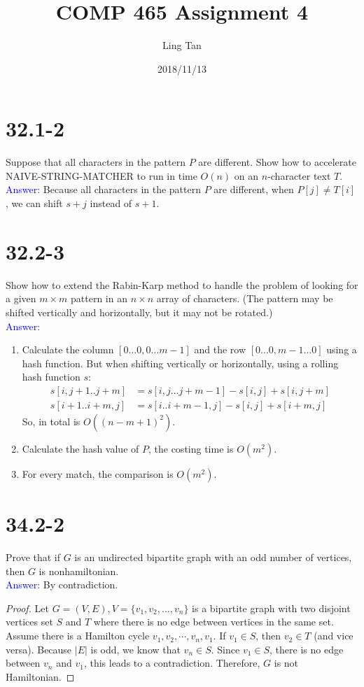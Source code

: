 \documentclass[a4paper]{article}
\title{COMP 465 Assignment 4}
\author{Ling Tan}
\date{2018/11/13}
\begin{document}
\maketitle

\section{32.1-2} Suppose that all characters in the pattern $P$ are different. Show how to accelerate NAIVE-STRING-MATCHER to run in time $O(n)$ on an $n$-character text $T$.\\
\textcolor{blue}{Answer:}
Because all characters in the pattern $P$ are different, when $P[j]\neq T[i]$, we can shift $s+j$ instead of $s+1$.
\section{32.2-3}
Show how to extend the Rabin-Karp method to handle the problem of looking for a given $m\times m$ pattern in an $n \times n$ array of characters. (The pattern may be shifted vertically and horizontally, but it may not be rotated.)\\
\textcolor{blue}{Answer:} 
    \begin{enumerate}
        \item Calculate the column $[0\ldots 0, 0\ldots m-1]$ and the row $[0\ldots 0, m-1\ldots 0]$ using a hash function. But when shifting vertically or horizontally, using a rolling hash function $s$:
            \begin{align*}
                s[i, j+1..j+m] & = s[i, j\ldots j+m-1] - s[i, j] + s[i, j+m]\\
                s[i+1..i+m, j] & = s[i..i+m-1, j] - s[i,j ] + s[i+m, j]
            \end{align*}
        So, in total is $O((n-m+1)^2)$.
        \item Calculate the hash value of $P$, the costing time is $O(m^2)$.
        \item For every match, the comparison is $O(m^2)$.
    \end{enumerate}
\section{34.2-2}
Prove that if $G$ is an undirected bipartite graph with an odd number of vertices, then $G$ is nonhamiltonian.\\
\textcolor{blue}{Answer:} By contradiction.
\begin{proof}
Let $G=(V,E), V=\{v_1,v_2,\ldots, v_n\}$ is a bipartite graph with two disjoint vertices set $S$ and $T$ where there is no edge between vertices in the same set. Assume there is a Hamilton cycle $v_1, v_2, \cdots, v_n, v_1$. If $v_1\in S$, then $v_2\in T$ (and vice versa). Because $|E|$ is odd, we know that $v_n\in S$. Since $v_1\in S$, there is no edge between $v_n$ and $v_1$, this leads to a contradiction. Therefore, $G$ is not Hamiltonian.

\end{proof}
\end{document}
